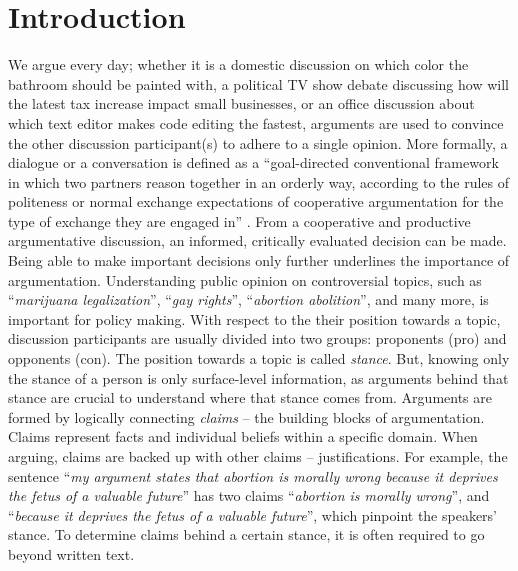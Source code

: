 \chapter{Introduction}

We argue every day; whether it is a domestic discussion on which color the
bathroom should be painted with, a political TV show debate discussing how will
the latest tax increase impact small businesses, or an office discussion about
which text editor makes code editing the fastest, arguments are used to
convince the other discussion participant(s) to adhere to a single opinion.
More formally, a dialogue or a conversation is defined as a ``goal-directed
conventional framework in which two partners reason 
together in an orderly way, 
according to the rules of politeness or normal exchange expectations
of cooperative argumentation for the type of exchange they are
engaged in'' \citep{walton1998new}. 
From a cooperative and productive argumentative discussion, 
an informed, critically evaluated decision can be made. 
Being able to make important decisions only further 
underlines the importance of argumentation. 
Understanding public opinion on controversial topics, such as 
``\textit{marijuana legalization}'', ``\textit{gay rights}'', 
``\textit{abortion abolition}'', and many more, is important for
policy making. 
With respect to the their position towards a topic, 
discussion participants are usually divided into two groups: 
proponents (pro) and opponents (con). The position towards a topic is called 
\emph{stance}. But, knowing only the stance of a person
is only surface-level information, as arguments behind that stance are
crucial to understand where that stance comes from. Arguments
are formed by logically connecting \emph{claims} -- the building blocks of argumentation. 
Claims represent facts and
individual beliefs within a specific domain. When arguing, claims are backed up
with other claims -- justifications. For example, the sentence ``\emph{my
argument states that abortion is morally wrong because it deprives the fetus of
a valuable future}'' has two claims ``\emph{abortion is morally wrong}'', and
``\emph{because it deprives the fetus of a valuable future}'', which pinpoint
the speakers' stance.  To determine claims behind a certain  stance, it is
often required to go beyond written text. 

